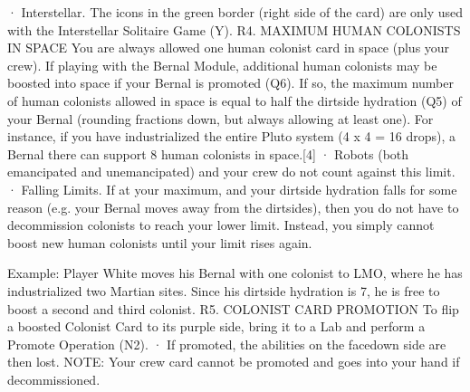 \documentclass[a4paper]{book}
\begin{document}
·       Interstellar. The icons in the green border (right side of the card) are only used with the Interstellar Solitaire Game (Y).
R4. MAXIMUM HUMAN COLONISTS IN SPACE
You are always allowed one human colonist card in space (plus your crew). If playing with the Bernal Module, additional human colonists may be boosted into space if your Bernal is promoted (Q6). If so, the maximum number of human colonists allowed in space is equal to half the dirtside hydration (Q5) of your Bernal (rounding fractions down, but always allowing at least one). For instance, if you have industrialized the entire Pluto system (4 x 4 = 16 drops), a Bernal there can support 8 human colonists in space.[4]
·       Robots (both emancipated and unemancipated) and your crew do not count against this limit.
·       Falling Limits. If at your maximum, and your dirtside hydration falls for some reason (e.g. your Bernal moves away from the dirtsides), then you do not have to decommission colonists to reach your lower limit. Instead, you simply cannot boost new human colonists until your limit rises again.

Example: Player White moves his Bernal with one colonist to LMO, where he has industrialized two Martian sites. Since his dirtside hydration is 7, he is free to boost a second and third colonist.
R5. COLONIST CARD PROMOTION
To flip a boosted Colonist Card to its purple side, bring it to a Lab and perform a Promote Operation (N2).
·       If promoted, the abilities on the facedown side are then lost.
NOTE: Your crew card cannot be promoted and goes into your hand if decommissioned.
\end{document}
